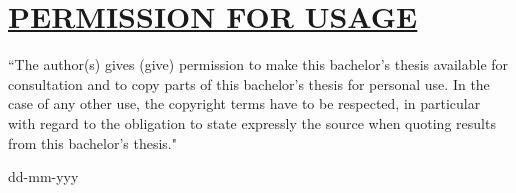 \section*{\uline{PERMISSION FOR USAGE}}
\fontsize{13}{20}\selectfont 
``The author(s) gives (give) permission to make this bachelor's thesis available for consultation and to copy parts of this bachelor's thesis for personal use. In the case of any other use, the copyright terms have to be respected, in particular with regard to the obligation to state expressly the source when quoting results from this bachelor's thesis."

\vspace*{1cm}

\vspace*{1cm}

\vspace*{1cm}
 \hspace{2cm} dd-mm-yyy
\pagebreak


\clearpage\mbox{}\clearpage